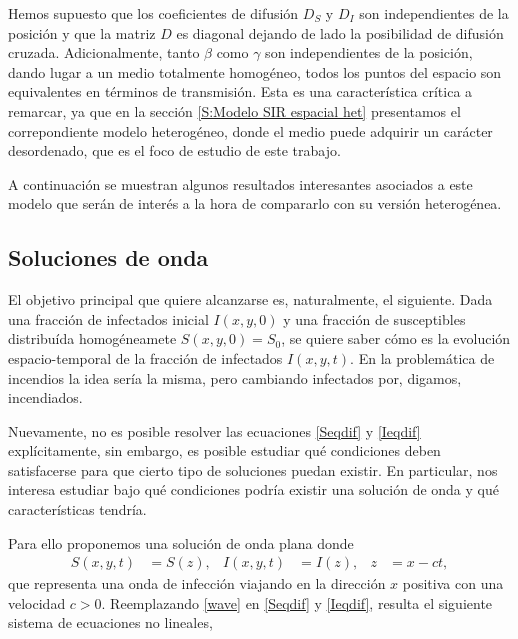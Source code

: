 Hemos supuesto que los coeficientes de difusión $D_{S}$ y $D_{I}$ son independientes de la posición y que la matriz $D$ es diagonal 
dejando de lado la posibilidad de difusión cruzada. Adicionalmente, tanto $\beta$ como $\gamma$ son 
independientes de la posición, dando lugar a un medio totalmente homogéneo, todos los puntos del espacio son equivalentes en términos de transmisión. Esta 
es una característica crítica a remarcar, ya que en la sección \ref{S:Modelo SIR espacial het} presentamos el correpondiente modelo heterogéneo, donde 
el medio puede adquirir un carácter desordenado, que es el foco de estudio de este trabajo.

A continuación se muestran algunos resultados interesantes asociados a este modelo que serán de interés a la hora de compararlo con su versión heterogénea.

\subsection{Soluciones de onda}
\label{ondas}

El objetivo principal que quiere alcanzarse es, naturalmente, el siguiente. Dada una fracción de infectados inicial $I(x,y,0)$ y una fracción de susceptibles 
distribuída homogéneamete $S(x,y,0)=S_0$, se quiere saber cómo es la evolución espacio-temporal de la fracción de infectados $I(x,y,t)$. En la problemática 
de incendios la idea sería la misma, pero cambiando infectados por, digamos, incendiados. 

Nuevamente, no es posible resolver las ecuaciones \ref{Seqdif} y \ref{Ieqdif} explícitamente, sin embargo, es posible estudiar qué condiciones deben 
satisfacerse para que cierto tipo de soluciones puedan existir. En particular, nos interesa estudiar bajo qué condiciones podría existir una solución de onda 
y qué características tendría.

Para ello proponemos una solución de onda plana donde 
\begin{align}
  S(x,y,t)&=S(z), & I(x,y,t)&=I(z), &  z&=x-ct, \label{wave}
\end{align}
que representa una onda de infección viajando en la dirección $x$ positiva con una velocidad $c>0$. Reemplazando \ref{wave} en \ref{Seqdif} y \ref{Ieqdif}, resulta el 
siguiente sistema de ecuaciones no lineales,

